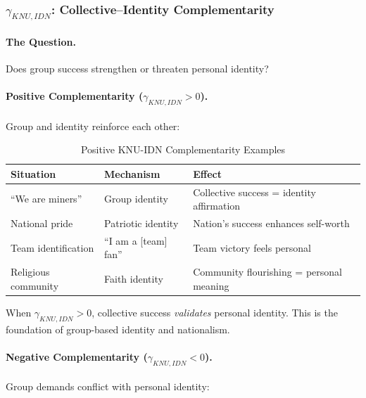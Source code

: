 \subsubsection{$\gamma_{KNU,IDN}$: Collective--Identity Complementarity}

\paragraph{The Question.}
Does group success strengthen or threaten personal identity?

\paragraph{Positive Complementarity ($\gamma_{KNU,IDN} > 0$).}
Group and identity reinforce each other:

\begin{table}[htbp]
\centering
\caption{Positive KNU-IDN Complementarity Examples}
\label{tab:knu-idn-positive}
\renewcommand{\arraystretch}{1.3}
\begin{tabular}{@{}lll@{}}
\toprule
\textbf{Situation} & \textbf{Mechanism} & \textbf{Effect} \\
\midrule
``We are miners'' & Group identity & Collective success = identity affirmation \\
National pride & Patriotic identity & Nation's success enhances self-worth \\
Team identification & ``I am a [team] fan'' & Team victory feels personal \\
Religious community & Faith identity & Community flourishing = personal meaning \\
\bottomrule
\end{tabular}
\end{table}

When $\gamma_{KNU,IDN} > 0$, collective success \emph{validates} personal identity.
This is the foundation of group-based identity and nationalism.

\paragraph{Negative Complementarity ($\gamma_{KNU,IDN} < 0$).}
Group demands conflict with personal identity:

